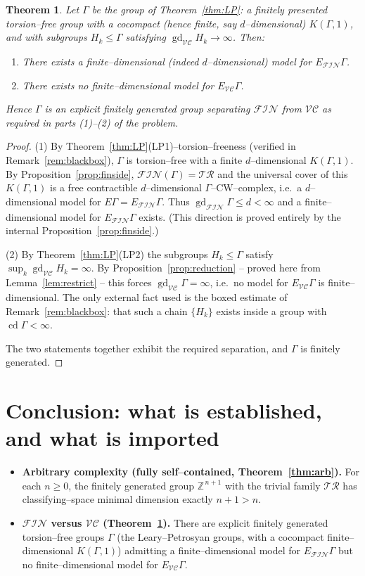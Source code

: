 \documentclass{amsart}
\newtheorem{theorem}{Theorem}
\theoremstyle{definition}
\newcommand{\Z}{\mathbb{Z}}
\newcommand{\FIN}{\mathcal{F\!I\!N}}
\newcommand{\VC}{\mathcal{V\!C}}
\newcommand{\gd}{\operatorname{gd}}
\newcommand{\cd}{\operatorname{cd}}
\begin{document}
\begin{theorem}\label{thm:main}
Let $\Gamma$ be the group of Theorem~\ref{thm:LP}: a finitely presented torsion--free group
with a cocompact (hence finite, say $d$--dimensional) $K(\Gamma,1)$, and with subgroups
$H_k\le\Gamma$ satisfying $\gd_{\VC}H_k\to\infty$. Then:
\begin{enumerate}
\item There exists a finite--dimensional (indeed $d$--dimensional) model for $E_{\FIN}\Gamma$.
\item There exists no finite--dimensional model for $E_{\VC}\Gamma$.
\end{enumerate}
Hence $\Gamma$ is an explicit finitely generated group separating $\FIN$ from $\VC$ as
required in parts (1)--(2) of the problem.
\end{theorem}

\begin{proof}
(1) By Theorem~\ref{thm:LP}(LP1)--torsion--freeness (verified in Remark~\ref{rem:blackbox}),
$\Gamma$ is torsion--free with a finite $d$--dimensional $K(\Gamma,1)$. By
Proposition~\ref{prop:finside}, $\FIN(\Gamma)=\mathcal{TR}$ and the universal cover of this
$K(\Gamma,1)$ is a free contractible $d$--dimensional $\Gamma$--CW--complex, i.e.\ a
$d$--dimensional model for $E\Gamma=E_{\FIN}\Gamma$. Thus $\gd_{\FIN}\Gamma\le d<\infty$ and a
finite--dimensional model for $E_{\FIN}\Gamma$ exists. (This direction is proved entirely by
the internal Proposition~\ref{prop:finside}.)

(2) By Theorem~\ref{thm:LP}(LP2) the subgroups $H_k\le\Gamma$ satisfy
$\sup_k\gd_{\VC}H_k=\infty$. By Proposition~\ref{prop:reduction} -- proved here from
Lemma~\ref{lem:restrict} -- this forces $\gd_{\VC}\Gamma=\infty$, i.e.\ no model for
$E_{\VC}\Gamma$ is finite--dimensional. The only external fact used is the boxed estimate of
Remark~\ref{rem:blackbox}: that such a chain $\{H_k\}$ exists inside a group with
$\cd\Gamma<\infty$.

The two statements together exhibit the required separation, and $\Gamma$ is finitely
generated.
\end{proof}

\section{Conclusion: what is established, and what is imported}

\begin{itemize}
\item \textbf{Arbitrary complexity (fully self--contained, Theorem~\ref{thm:arb}).} For each
$n\ge 0$, the finitely generated group $\Z^{\,n+1}$ with the trivial family $\mathcal{TR}$ has
classifying--space minimal dimension exactly $n+1>n$.

\item \textbf{$\FIN$ versus $\VC$ (Theorem~\ref{thm:main}).} There are explicit finitely
generated torsion--free groups $\Gamma$ (the Leary--Petrosyan groups, with a cocompact
finite--dimensional $K(\Gamma,1)$) admitting a finite--dimensional model for $E_{\FIN}\Gamma$
but no finite--dimensional model for $E_{\VC}\Gamma$.
\end{itemize}
\end{document}
